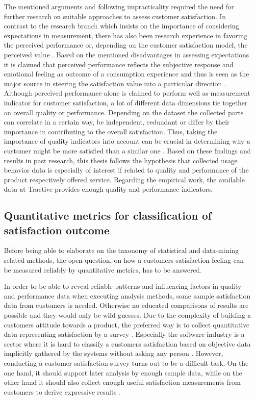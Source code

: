 The mentioned arguments and following impracticality required the need for further research on suitable approaches to assess customer satisfaction. In contrast to the research branch which insists on the importance of considering expectations in measurement, there has also been research experience in favoring the perceived performance or, depending on the customer satisfaction model, the perceived value \cite{yuksel1998customer}. Based on the mentioned disadvantages in assessing expectations it is claimed that perceived performance reflects the subjective response and emotional feeling as outcome of a consumption experience and thus is seen as the major source in steering the satisfaction value into a particular direction \cite{halstead1994multisource} \cite{cronin1992measuring}. Although perceived performance alone is claimed to perform well as measurement indicator for customer satisfaction, a lot of different data dimensions tie together an overall quality or performance. Depending on the dataset the collected parts can correlate in a certain way, be independent, redundant or differ by their importance in contributing to the overall satisfaction. Thus, taking the importance of quality indicators into account can be crucial in determining why a customer might be more satisfied than a similar one \cite{barsky1992customer}. Based on these findings and results in past research, this thesis follows the hypothesis that collected usage behavior data is especially of interest if related to quality and performance of the product respectively offered service. Regarding the empirical work, the available data at Tractive provides enough quality and performance indicators. 

\subsection{Quantitative metrics for classification of satisfaction outcome}
\label{ssec:quantitativeMetrics}
Before being able to elaborate on the taxonomy of statistical and data-mining related methods, the open question, on how a customers satisfaction feeling can be measured reliably by quantitative metrics, has to be answered. 

In order to be able to reveal reliable patterns and influencing factors in quality and performance data when executing analysis methods, some sample satisfaction data from customers is needed. Otherwise no educated comparisons of results are possible and they would only be wild guesses. Due to the complexity of building a customers attitude towards a product, the preferred way is to collect quantitative data representing satisfaction by a survey \cite{yuksel1998customer} \cite{hayes1998measuring}. Especially the software industry is a sector where it is hard to classify a customers satisfaction based on objective data implicitly gathered by the systems without asking any person \cite{hayes1998measuring}. However, conducting a customer satisfaction survey turns out to be a difficult task. On the one hand, it should support later analysis by enough sample data, while on the other hand it should also collect enough useful satisfaction measurements from customers to derive expressive results \cite{sauermann2013increasing}. 

